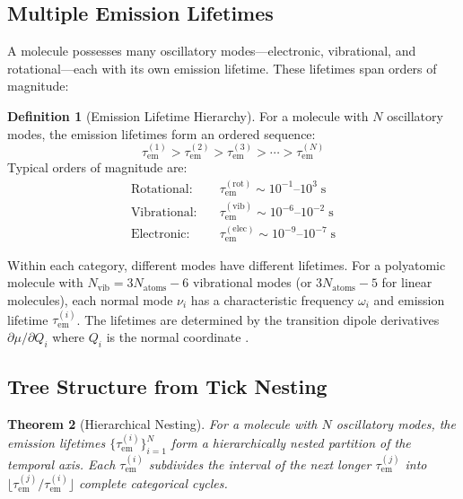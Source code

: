 \documentclass[11pt,twocolumn,a4paper]{article}
\newtheorem{theorem}{Theorem}[section]
\theoremstyle{definition}
\newtheorem{definition}[theorem]{Definition}
\theoremstyle{remark}
\newcommand{\tem}{\tau_{\mathrm{em}}}
\begin{document}
\subsection{Multiple Emission Lifetimes}

A molecule possesses many oscillatory modes---electronic, vibrational, and rotational---each with its own emission lifetime. These lifetimes span orders of magnitude:

\begin{definition}[Emission Lifetime Hierarchy]
\label{def:lifetime_hierarchy}
For a molecule with $N$ oscillatory modes, the emission lifetimes form an ordered sequence:
\begin{equation}
\tem^{(1)} > \tem^{(2)} > \tem^{(3)} > \cdots > \tem^{(N)}
\label{eq:lifetime_ordering}
\end{equation}
Typical orders of magnitude are:
\begin{align}
\text{Rotational:} \quad & \tem^{(\mathrm{rot})} \sim 10^{-1} \text{--} 10^{3} \;\mathrm{s} \label{eq:rot_lifetime} \\
\text{Vibrational:} \quad & \tem^{(\mathrm{vib})} \sim 10^{-6} \text{--} 10^{-2} \;\mathrm{s} \label{eq:vib_lifetime} \\
\text{Electronic:} \quad & \tem^{(\mathrm{elec})} \sim 10^{-9} \text{--} 10^{-7} \;\mathrm{s} \label{eq:elec_lifetime}
\end{align}
\end{definition}

Within each category, different modes have different lifetimes. For a polyatomic molecule with $N_{\mathrm{vib}} = 3N_{\mathrm{atoms}} - 6$ vibrational modes (or $3N_{\mathrm{atoms}} - 5$ for linear molecules), each normal mode $\nu_i$ has a characteristic frequency $\omega_i$ and emission lifetime $\tem^{(i)}$. The lifetimes are determined by the transition dipole derivatives $\partial\mu/\partial Q_i$ where $Q_i$ is the normal coordinate \citep{wilson1955, herzberg1945}.

\subsection{Tree Structure from Tick Nesting}

\begin{theorem}[Hierarchical Nesting]
\label{thm:hierarchical_nesting}
For a molecule with $N$ oscillatory modes, the emission lifetimes $\{\tem^{(i)}\}_{i=1}^{N}$ form a hierarchically nested partition of the temporal axis. Each $\tem^{(i)}$ subdivides the interval of the next longer $\tem^{(j)}$ into $\lfloor \tem^{(j)}/\tem^{(i)} \rfloor$ complete categorical cycles.
\end{theorem}
\end{document}

